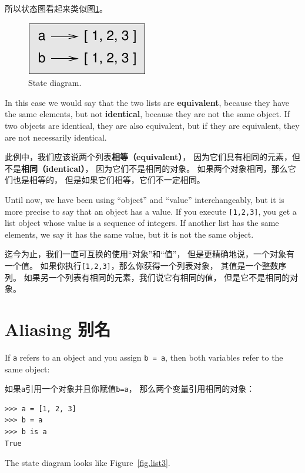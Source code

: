 \documentclass[10pt]{book}
\begin{document}
\begin{CJK}{UTF8}{gbsn}
所以状态图看起来类似图\ref{fig.list2}。

\begin{figure}
\centerline
{\includegraphics[scale=0.8]{figs/list2.pdf}}
\caption{State diagram.}
\label{fig.list2}
\end{figure}


In this case we would say that the two lists are {\bf equivalent},
because they have the same elements, but not {\bf identical}, because
they are not the same object.  If two objects are identical, they are
also equivalent, but if they are equivalent, they are not necessarily
identical.

此例中，我们应该说两个列表{\bf 相等（equivalent）}，
因为它们具有相同的元素，但不是{\bf 相同（identical）}，
因为它们不是相同的对象。
如果两个对象相同，那么它们也是相等的，
但是如果它们相等，它们不一定相同。

Until now, we have been using ``object'' and ``value''
interchangeably, but it is more precise to say that an object has a
value.  If you execute {\tt [1,2,3]}, you get a list
object whose value is a sequence of integers.  If another
list has the same elements, we say it has the same value, but
it is not the same object.

迄今为止，我们一直可互换的使用``对象''和``值''，
但是更精确地说，一个对象有一个值。
如果你执行{\tt [1,2,3]}，那么你获得一个列表对象，
其值是一个整数序列。
如果另一个列表有相同的元素，我们说它有相同的值，
但是它不是相同的对象。


\section{Aliasing 别名}

If {\tt a} refers to an object and you assign {\tt b = a},
then both variables refer to the same object:

如果{\tt a}引用一个对象并且你赋值{\tt b=a}，
那么两个变量引用相同的对象：

\begin{verbatim}
>>> a = [1, 2, 3]
>>> b = a
>>> b is a
True
\end{verbatim}
%
The state diagram looks like Figure~\ref{fig.list3}.


\end{CJK}
\end{document}
